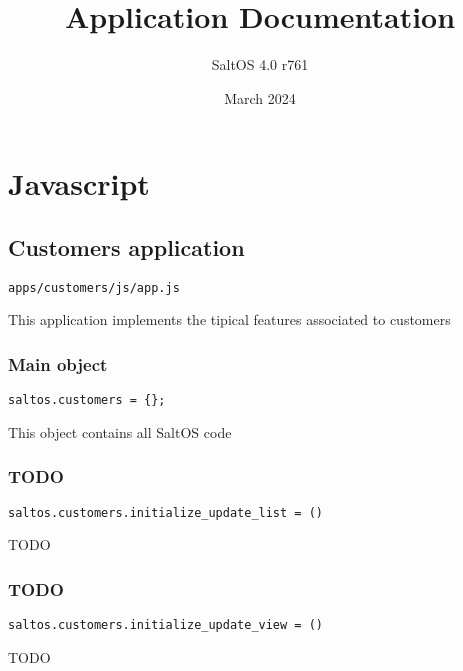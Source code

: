 \documentclass[a4paper]{article}
\title{Application Documentation}
\author{SaltOS 4.0 r761}
\begin{document}
\date{March 2024}
\maketitle
\clearpage

\tableofcontents
\clearpage


\hypertarget{toc1}{}
\section{Javascript}

\hypertarget{toc2}{}
\subsection{Customers application}

\begin{lstlisting}
apps/customers/js/app.js
\end{lstlisting}

This application implements the tipical features associated to customers

\hypertarget{toc3}{}
\subsubsection{Main object}

\begin{lstlisting}
saltos.customers = {};
\end{lstlisting}

This object contains all SaltOS code

\hypertarget{toc4}{}
\subsubsection{TODO}

\begin{lstlisting}
saltos.customers.initialize_update_list = ()
\end{lstlisting}

TODO

\hypertarget{toc5}{}
\subsubsection{TODO}

\begin{lstlisting}
saltos.customers.initialize_update_view = ()
\end{lstlisting}

TODO

\hypertarget{toc6}{}
\end{document}
